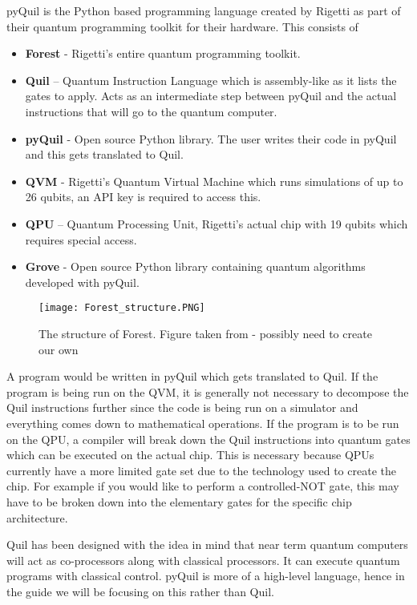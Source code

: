 pyQuil is the Python based programming language created by Rigetti \cite{pyQuilDoc} as part of their quantum programming toolkit for their hardware. This consists of
\begin{itemize}
    \item \textbf{Forest} - Rigetti's entire quantum programming toolkit. 
    \item \textbf{Quil} – Quantum Instruction Language which is assembly-like as it lists the gates to apply. Acts as an intermediate step between pyQuil and the actual instructions that will go to the quantum computer.
    \item \textbf{pyQuil} - Open source Python library. The user writes their code in pyQuil and this gets translated to Quil.
    \item \textbf{QVM} - Rigetti's Quantum Virtual Machine which runs simulations of up to 26 qubits, an API key is required to access this.
    \item \textbf{QPU} – Quantum Processing Unit, Rigetti's actual chip with 19 qubits which requires special access.
    \item \textbf{Grove} - Open source Python library containing quantum algorithms developed with pyQuil. 
\end{itemize}

\begin{figure}[H]
    \centering
    \texttt{[image: Forest\_structure.PNG]}
    \caption{The structure of Forest. Figure taken from \cite{Rigetti2016} - possibly need to create our own}
    \label{fig:my_label}
\end{figure}

A program would be written in pyQuil which gets translated to Quil. If the program is being run on the QVM, it is generally not necessary to decompose the Quil instructions further since the code is being run on a simulator and everything comes down to mathematical operations. If the program is to be run on the QPU, a compiler will break down the Quil instructions into quantum gates which can be executed on the actual chip. This is necessary because QPUs currently have a more limited gate set due to the technology used to create the chip. For example if you would like to perform a controlled-NOT gate, this may have to be broken down into the elementary gates for the specific chip architecture.  

Quil has been designed with the idea in mind that near term quantum computers will act as co-processors along with classical processors. It can execute quantum programs with classical control. pyQuil is more of a high-level language, hence in the guide we will be focusing on this rather than Quil.   

